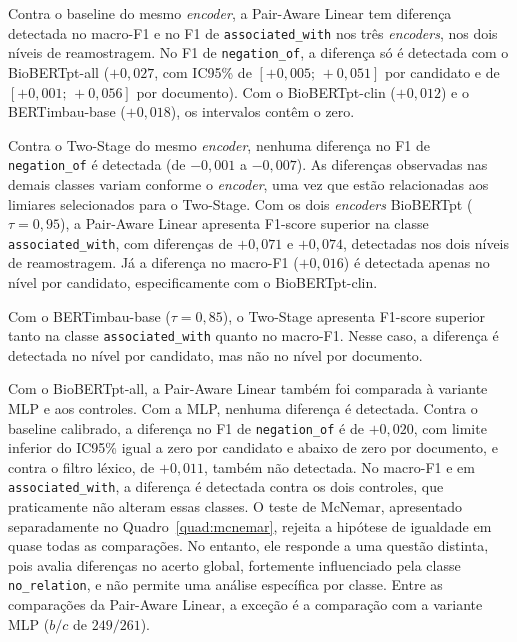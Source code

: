 

Contra o baseline do mesmo \emph{encoder}, a Pair-Aware Linear tem diferença
detectada no macro-F1 e no F1 de \texttt{associated\_with} nos três
\emph{encoders}, nos dois níveis de reamostragem. No F1 de \texttt{negation\_of},
a diferença só é detectada com o BioBERTpt-all ($+0{,}027$, com IC95\% de
$[+0{,}005;\,+0{,}051]$ por candidato e de $[+0{,}001;\,+0{,}056]$ por documento). Com
o BioBERTpt-clin ($+0{,}012$) e o BERTimbau-base ($+0{,}018$), os intervalos contêm o
zero.

Contra o Two-Stage do mesmo \emph{encoder}, nenhuma diferença no F1 de
\texttt{negation\_of} é detectada (de $-0{,}001$ a $-0{,}007$). As diferenças observadas nas demais classes variam conforme o \emph{encoder}, uma vez que estão relacionadas aos limiares selecionados para o Two-Stage. Com os dois \emph{encoders} BioBERTpt ($\tau=0{,}95$), a Pair-Aware Linear apresenta F1-score superior na classe \texttt{associated\_with}, com diferenças de $+0{,}071$ e $+0{,}074$, detectadas nos dois níveis de reamostragem. Já a diferença no macro-F1 ($+0{,}016$) é detectada apenas no nível por candidato, especificamente com o BioBERTpt-clin.

Com o BERTimbau-base ($\tau=0{,}85$), o Two-Stage apresenta F1-score superior tanto na classe \texttt{associated\_with} quanto no macro-F1. Nesse caso, a diferença é detectada no nível por candidato, mas não no nível por documento.

Com o BioBERTpt-all, a Pair-Aware Linear também foi comparada à variante MLP e aos
controles. Com a MLP, nenhuma diferença é detectada. Contra o baseline calibrado, a
diferença no F1 de \texttt{negation\_of} é de $+0{,}020$, com limite inferior do
IC95\% igual a zero por candidato e abaixo de zero por documento, e contra o filtro
léxico, de $+0{,}011$, também não detectada. No macro-F1 e em
\texttt{associated\_with}, a diferença é detectada contra os dois controles, que
praticamente não alteram essas classes. O teste de McNemar, apresentado separadamente no Quadro~\ref{quad:mcnemar}, rejeita a hipótese de igualdade em quase todas as comparações. No entanto, ele responde a uma questão distinta, pois avalia diferenças no acerto global, fortemente influenciado pela classe \texttt{no\_relation}, e não permite uma análise específica por classe. Entre as comparações da
Pair-Aware Linear, a exceção é a comparação com a variante MLP ($b/c$ de $249/261$).



